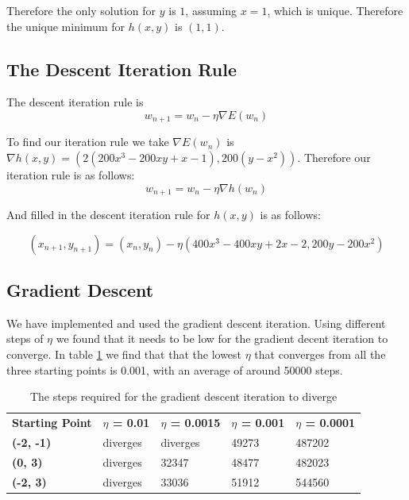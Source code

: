 \documentclass[11pt]{article}
\begin{document}
Therefore the only solution for $y$ is $1$, assuming $x=1$, which is unique. Therefore the unique minimum for $h(x,y)$ is $(1,1)$.
\subsection{The Descent Iteration Rule}
The descent iteration rule is 
\[
	w_{n+1} = w_n - \eta \nabla E(w_n)
\]

To find our iteration rule we take $\nabla E(w_n)$ is $\nabla h(x,y) = (2 (200 x^3-200 x y+x-1), 200 (y-x^2))$. Therefore our iteration rule is as follows:
\[
w_{n+1} = w_n - \eta \nabla h(w_n)
\]

And filled in the descent iteration rule for $h(x,y)$ is as follows:

\[
(x_{n+1},y_{n+1}) = (x_n,y_n) - \eta (400 x^3-400 x y+2x-2, 200y-200x^2)
\]

\subsection{Gradient Descent}

We have implemented and used the gradient descent iteration. Using different steps of $\eta$ we found that it needs to be low for the gradient decent iteration to converge. In table \ref{tbl:eta} we find that that the lowest $\eta$  that converges from all the three starting points is 0.001, with an average of around 50000 steps. 

\begin{table}[H]
	\centering
	\label{tbl:eta}
	\begin{tabular}{|l|l|l|l|l|}
		\hline
		\textbf{Starting Point} & \textbf{$\eta$ = 0.01} & \textbf{$\eta$ = 0.0015} & \textbf{$\eta$ = 0.001} & \textbf{$\eta$ = 0.0001} \\ \cline{2-5} 
		\textbf{(-2, -1)}       & diverges               & diverges                 & 49273                   & 487202                   \\ \cline{2-5} 
		\textbf{(0, 3)}         & diverges               & 32347                    & 48477                   & 482023                   \\ \cline{2-5} 
		\textbf{(-2, 3)}        & diverges               & 33036                    & 51912                   & 544560                   \\ \hline
	\end{tabular}
	\caption{The steps required for the gradient descent iteration to diverge}
\end{table}
\end{document}
